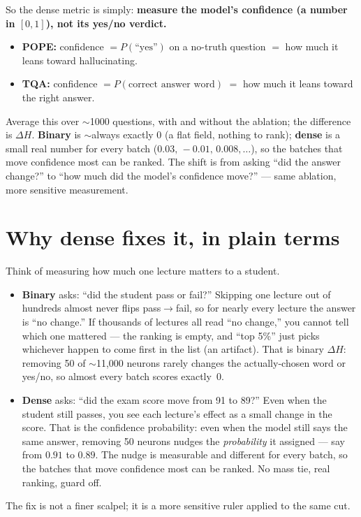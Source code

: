 \documentclass[11pt,a4paper]{article}
\begin{document}
So the dense metric is simply: \textbf{measure the model's confidence (a number in $[0,1]$),
not its yes/no verdict.}
\begin{itemize}[nosep]
\item \textbf{POPE:} confidence $=P(\text{``yes''})$ on a no-truth question $=$ how much it
leans toward hallucinating.
\item \textbf{TQA:} confidence $=P(\text{correct answer word})$ $=$ how much it leans toward
the right answer.
\end{itemize}
Average this over $\sim$1000 questions, with and without the ablation; the difference is
$\Delta H$. \textbf{Binary} is $\sim$always exactly $0$ (a flat field, nothing to rank);
\textbf{dense} is a small real number for every batch ($0.03,\,-0.01,\,0.008,\dots$), so the
batches that move confidence most can be ranked. The shift is from asking ``did the answer
change?'' to ``how much did the model's confidence move?'' --- same ablation, more sensitive
measurement.

\section{Why dense fixes it, in plain terms}
Think of measuring how much one lecture matters to a student.
\begin{itemize}[nosep]
\item \textbf{Binary} asks: ``did the student pass or fail?'' Skipping one lecture out of
hundreds almost never flips pass$\to$fail, so for nearly every lecture the answer is ``no
change.'' If thousands of lectures all read ``no change,'' you cannot tell which one
mattered --- the ranking is empty, and ``top 5\%'' just picks whichever happen to come
first in the list (an artifact). That is binary $\Delta H$: removing 50 of $\sim$11{,}000
neurons rarely changes the actually-chosen word or yes/no, so almost every batch scores
exactly~$0$.
\item \textbf{Dense} asks: ``did the exam score move from 91 to 89?'' Even when the student
still passes, you see each lecture's effect as a small change in the score. That is the
confidence probability: even when the model still says the same answer, removing 50 neurons
nudges the \emph{probability} it assigned --- say from $0.91$ to $0.89$. The nudge is
measurable and different for every batch, so the batches that move confidence most can be
ranked. No mass tie, real ranking, guard off.
\end{itemize}
The fix is not a finer scalpel; it is a more sensitive ruler applied to the same cut.
\end{document}
